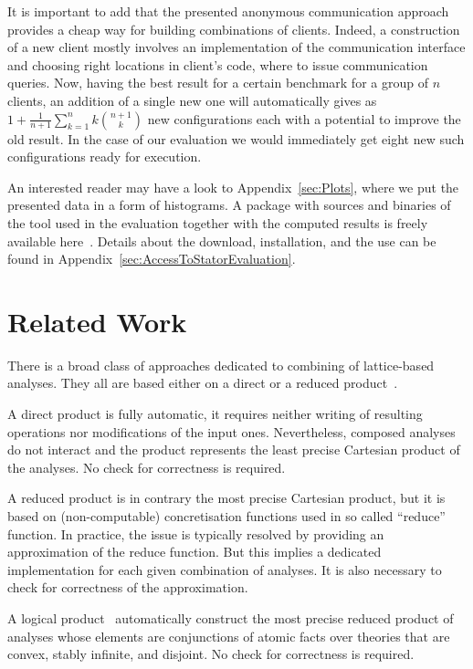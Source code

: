 \documentclass[envcountsame]{llncs}
\begin{document}
\vspace{2mm}
It is important to add that the presented anonymous communication approach
provides a cheap way for building combinations of clients. Indeed, a
construction of a new client mostly involves an implementation of the
communication interface and choosing right locations in client's code, where to
issue communication queries. Now, having the best result for a certain benchmark
for a group of $ n $ clients, an addition of a single new one will automatically
gives as $ 1 + \frac{1}{n+1} \sum_{k=1}^{n} k\binom{n+1}{k} $ new configurations
each with a potential to improve the old result. In the case of our evaluation
we would immediately get eight new such configurations ready for execution.

An interested reader may have a look to Appendix~\ref{sec:Plots}, where we put
the presented data in a form of histograms. A package with sources and binaries
of the tool used in the evaluation together with the computed results is
freely available here~\cite{StatorURL}. Details about the
download, installation, and the use can be found in
Appendix~\ref{sec:AccessToStatorEvaluation}.


\section{Related Work}
\label{sec:RelatedWork}



There is a broad class of approaches dedicated to combining of lattice-based
analyses. They all are based either on a direct or a reduced
product~\cite{DirectReducedProduct}.

A direct product is fully automatic, it requires neither writing of resulting
operations nor modifications of the input ones. Nevertheless, composed analyses
do not interact and the product represents the least precise Cartesian product
of the analyses. No check for correctness is required.

A reduced product is in contrary the most precise Cartesian product, but it is
based on (non-computable) concretisation functions used in so called ``reduce''
function. In practice, the issue is typically resolved by providing an
approximation of the reduce function. But this implies a dedicated
implementation for each given combination of analyses. It is also necessary to
check for correctness of the approximation.

A logical product~\cite{LogicalProduct} automatically construct the most precise
reduced product of analyses whose elements are conjunctions of atomic facts over
theories that are convex, stably infinite, and disjoint. No check for
correctness is required. 
\end{document}
